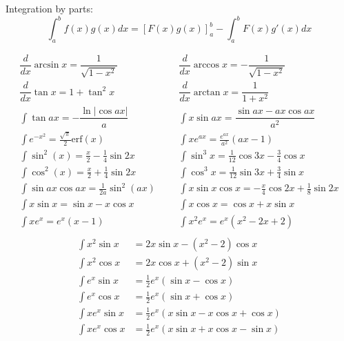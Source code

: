 Integration by parts:
\[\int_a^bf(x)g(x)dx = [F(x)g(x)]_a^b-\int_a^bF(x)g'(x)dx\]

\begin{align*}
	\dfrac{d}{dx}\arcsin x = \dfrac{1}{\sqrt{1-x^2}} &&& \dfrac{d}{dx}\arccos x = -\dfrac{1}{\sqrt{1-x^2}} \\
	\dfrac{d}{dx}\tan x = 1+\tan^2 x &&& \dfrac{d}{dx}\arctan x = \dfrac{1}{1+x^2} \\
	\int\tan ax = -\dfrac{\ln|\cos ax|}{a} &&& \int x\sin ax = \dfrac{\sin ax-ax \cos ax}{a^2} \\
	\int e^{-x^2} = \frac{\sqrt \pi}{2} \text{erf}(x) &&& \int xe^{ax} = \frac{e^{ax}}{a^2}(ax-1) \\
    \int \sin^2(x) = \frac{x}{2} - \frac{1}{4} \sin 2x &&& \int \sin^3 x = \frac{1}{12}\cos 3x - \frac{3}{4} \cos x \\
    \int \cos^2(x) = \frac{x}{2} + \frac{1}{4} \sin 2x &&& \int \cos^3 x = \frac{1}{12}\sin 3x + \frac{3}{4} \sin x \\
    \int \sin ax \cos ax = \frac{1}{2a}\sin^2(ax) &&& \int x \sin x \cos x = -\frac{x}{4}\cos 2x + \frac{1}{8} \sin 2x \\
    \int x \sin x = \sin x - x \cos x &&& \int x \cos x = \cos x + x \sin x \\
    \int xe^x = e^x(x - 1) &&& \int x^2 e^x = e^x(x^2 - 2x + 2) \\
\end{align*}
\vspace{-1cm}
\begin{align*}
    \int x^2 \sin x &= 2x \sin x - (x^2 - 2) \cos x \\
    \int x^2 \cos x &= 2x \cos x + (x^2 - 2) \sin x \\
    \int e^x \sin x &= \frac{1}{2}e^x (\sin x - \cos x) \\
    \int e^x \cos x &= \frac{1}{2}e^x (\sin x + \cos x) \\
    \int xe^x \sin x &= \frac{1}{2}e^x (x \sin x - x \cos x + \cos x) \\
    \int xe^x \cos x &= \frac{1}{2}e^x (x \sin x + x \cos x - \sin x)
\end{align*}
